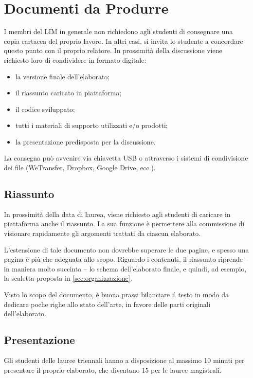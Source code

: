 \documentclass[12pt]{report}
\begin{document}
\chapter{Documenti da Produrre}
I membri del LIM in generale non richiedono agli studenti di consegnare una copia cartacea del proprio lavoro. In altri casi, si invita lo studente a concordare questo punto con il proprio relatore.
In prossimità della discussione viene richiesto loro di condividere in formato digitale:
\begin{itemize}
	\item la versione finale dell'elaborato;
	\item il riassunto caricato in piattaforma;
	\item il codice sviluppato;
	\item tutti i materiali di supporto utilizzati e/o prodotti;
	\item la presentazione predisposta per la discussione.
\end{itemize}

La consegna può avvenire via chiavetta USB o attraverso i sistemi di condivisione dei file (WeTransfer, Dropbox, Google Drive, ecc.).

\section{Riassunto}
In prossimità della data di laurea, viene richiesto agli studenti di caricare in piattaforma anche il riassunto. La sua funzione è permettere alla commissione di visionare rapidamente gli argomenti trattati da ciascun elaborato.

L'estensione di tale documento non dovrebbe superare le due pagine, e spesso una pagina è più che adeguata allo scopo. Riguardo i contenuti, il riassunto riprende -- in maniera molto succinta -- lo schema dell'elaborato finale, e quindi, ad esempio, la scaletta proposta in \ref{sec:organizzazione}.

Visto lo scopo del documento, è buona prassi bilanciare il testo in modo da dedicare poche righe allo stato dell'arte, in favore delle parti originali dell'elaborato.

\section{Presentazione}
Gli studenti delle lauree triennali hanno a disposizione al massimo 10 minuti per presentare il proprio elaborato, che diventano 15 per le lauree magistrali. 
\end{document}
